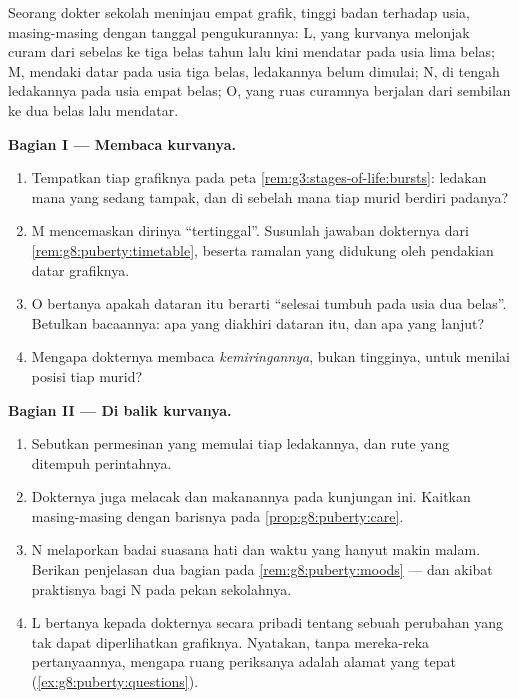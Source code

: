 \begin{problem}\label{pb:g8:puberty:1}
Seorang dokter sekolah meninjau empat grafik, tinggi badan
terhadap usia, masing-masing dengan tanggal pengukurannya:
L, yang kurvanya melonjak curam dari sebelas ke tiga belas
tahun lalu kini mendatar pada usia lima belas; M, mendaki
datar pada usia tiga belas, ledakannya belum dimulai; N, di
tengah ledakannya pada usia empat belas; O, yang ruas
curamnya berjalan dari sembilan ke dua belas lalu mendatar.

\medskip\noindent\textbf{Bagian I --- Membaca kurvanya.}
\begin{enumerate}
  \item Tempatkan tiap grafiknya pada peta
        \cref{rem:g3:stages-of-life:bursts}: ledakan mana
        yang sedang tampak, dan di sebelah mana tiap murid
        berdiri padanya?
  \item M mencemaskan dirinya ``tertinggal''. Susunlah
        jawaban dokternya dari
        \cref{rem:g8:puberty:timetable}, beserta ramalan
        yang didukung oleh pendakian datar grafiknya.
  \item O bertanya apakah dataran itu berarti ``selesai
        tumbuh pada usia dua belas''. Betulkan bacaannya:
        apa yang diakhiri dataran itu, dan apa yang lanjut?
  \item Mengapa dokternya membaca \emph{kemiringannya},
        bukan tingginya, untuk menilai posisi tiap murid?
\end{enumerate}

\medskip\noindent\textbf{Bagian II --- Di balik kurvanya.}
\begin{enumerate}[resume]
  \item Sebutkan permesinan yang memulai tiap ledakannya,
        dan rute yang ditempuh perintahnya.
  \item Dokternya juga melacak  dan makanannya pada
        kunjungan ini. Kaitkan masing-masing dengan barisnya
        pada \cref{prop:g8:puberty:care}.
  \item N melaporkan badai suasana hati dan waktu  yang
        hanyut makin malam. Berikan penjelasan dua bagian
        pada \cref{rem:g8:puberty:moods} --- dan akibat
        praktisnya bagi  N pada pekan sekolahnya.
  \item L bertanya kepada dokternya secara pribadi tentang
        sebuah perubahan yang tak dapat diperlihatkan
        grafiknya. Nyatakan, tanpa mereka-reka pertanyaannya,
        mengapa ruang periksanya adalah alamat yang tepat
        (\cref{ex:g8:puberty:questions}).
\end{enumerate}


\end{problem}
